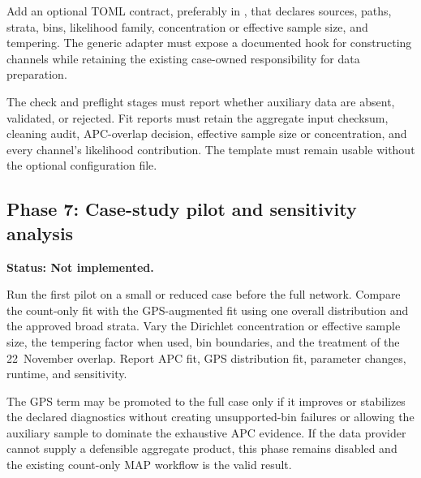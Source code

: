 Add an optional TOML contract, preferably in
, that declares sources, paths,
strata, bins, likelihood family, concentration or effective sample size, and
tempering.  The generic adapter must expose a documented hook for constructing
channels while retaining the existing case-owned responsibility for data
preparation.

The check and preflight stages must report whether auxiliary data are absent,
validated, or rejected.  Fit reports must retain the aggregate input checksum,
cleaning audit, APC-overlap decision, effective sample size or concentration,
and every channel's likelihood contribution.  The template must remain usable
without the optional configuration file.

\subsection{Phase 7: Case-study pilot and sensitivity analysis}
\label{sec:gps-implementation-phase-7}
\textbf{Status: Not implemented.}

Run the first pilot on a small or reduced case before the full network.  Compare
the count-only fit with the GPS-augmented fit using one overall distribution
and the approved broad strata.  Vary the Dirichlet concentration or effective
sample size, the tempering factor when used, bin boundaries, and the treatment
of the 22~November overlap.  Report APC fit, GPS distribution fit, parameter
changes, runtime, and sensitivity.

The GPS term may be promoted to the full case only if it improves or stabilizes
the declared diagnostics without creating unsupported-bin failures or allowing
the auxiliary sample to dominate the exhaustive APC evidence.  If the data
provider cannot supply a defensible aggregate product, this phase remains
disabled and the existing count-only MAP workflow is the valid result.
